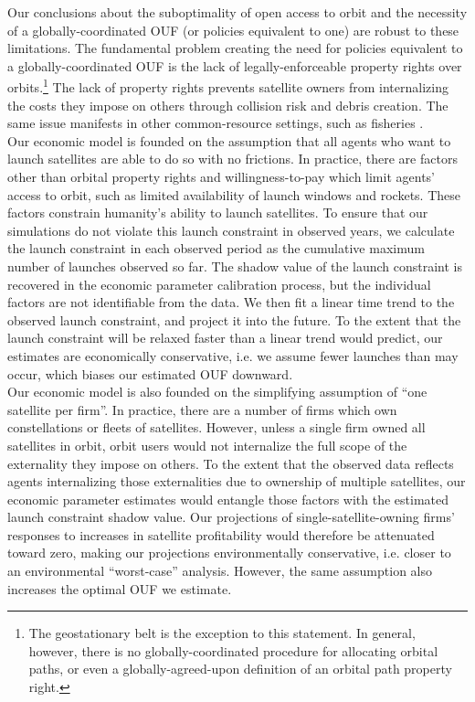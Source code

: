 \documentclass[9pt,twoside,lineno]{pnas-new}
\begin{document}
Our conclusions about the suboptimality of open access to orbit and the necessity of a globally-coordinated OUF (or policies equivalent to one) are robust to these limitations.  The fundamental problem creating the need for policies equivalent to a globally-coordinated OUF is the lack of legally-enforceable property rights over orbits.\footnote{The geostationary belt is the exception to this statement. In general, however, there is no globally-coordinated procedure for allocating orbital paths, or even a globally-agreed-upon definition of an orbital path property right.} The lack of property rights prevents satellite owners from internalizing the costs they impose on others through collision risk and debris creation. The same issue manifests in other common-resource settings, such as fisheries \cite{gordon1954}. \\

Our economic model is founded on the assumption that all agents who want to launch satellites are able to do so with no frictions. In practice, there are factors other than orbital property rights and willingness-to-pay which limit agents' access to orbit, such as limited availability of launch windows and rockets. These factors constrain humanity's ability to launch satellites. To ensure that our simulations do not violate this launch constraint in observed years, we calculate the launch constraint in each observed period as the cumulative maximum number of launches observed so far. The shadow value of the launch constraint is recovered in the economic parameter calibration process, but the individual factors are not identifiable from the data. We then fit a linear time trend to the observed launch constraint, and project it into the future. To the extent that the launch constraint will be relaxed faster than a linear trend would predict, our estimates are economically conservative, i.e. we assume fewer launches than may occur, which biases our estimated OUF downward. \\

Our economic model is also founded on the simplifying assumption of ``one satellite per firm''. In practice, there are a number of firms which own constellations or fleets of satellites. However, unless a single firm owned all satellites in orbit, orbit users would not internalize the full scope of the externality they impose on others. To the extent that the observed data reflects agents internalizing those externalities due to ownership of multiple satellites, our economic parameter estimates would entangle those factors with the estimated launch constraint shadow value. Our projections of single-satellite-owning firms' responses to increases in satellite profitability would therefore be attenuated toward zero, making our projections environmentally conservative, i.e. closer to an environmental ``worst-case'' analysis. However, the same assumption also increases the optimal OUF we estimate. \\
\end{document}

